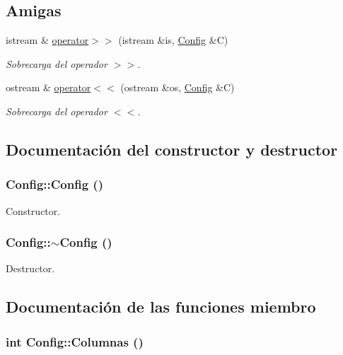 \subsection*{Amigas}
\begin{CompactItemize}
\item 
istream \& \hyperlink{class_config_d9d17872a79524063d3afa93725719e3}{operator$>$$>$} (istream \&is, \hyperlink{class_config}{Config} \&C)
\begin{CompactList}\small\item\em Sobrecarga del operador $>$$>$. \item\end{CompactList}\item 
ostream \& \hyperlink{class_config_281dd477583c5361ca8fbdd58a80ca72}{operator$<$$<$} (ostream \&os, \hyperlink{class_config}{Config} \&C)
\begin{CompactList}\small\item\em Sobrecarga del operador $<$$<$. \item\end{CompactList}\end{CompactItemize}


\subsection{Documentación del constructor y destructor}
\hypertarget{class_config_bd0c571c116924871e30444b192b792a}{
\subsubsection[{Config}]{\setlength{\rightskip}{0pt plus 5cm}Config::Config ()}}
\label{class_config_bd0c571c116924871e30444b192b792a}


Constructor. 

\hypertarget{class_config_543dce59b66475c5108088ee4ce1cdfc}{
\subsubsection[{$\sim$Config}]{\setlength{\rightskip}{0pt plus 5cm}Config::$\sim$Config ()}}
\label{class_config_543dce59b66475c5108088ee4ce1cdfc}


Destructor. 



\subsection{Documentación de las funciones miembro}
\hypertarget{class_config_7f64981766eaccc7726295beb6e06d1a}{
\subsubsection[{Columnas}]{\setlength{\rightskip}{0pt plus 5cm}int Config::Columnas ()}}
\label{class_config_7f64981766eaccc7726295beb6e06d1a}


